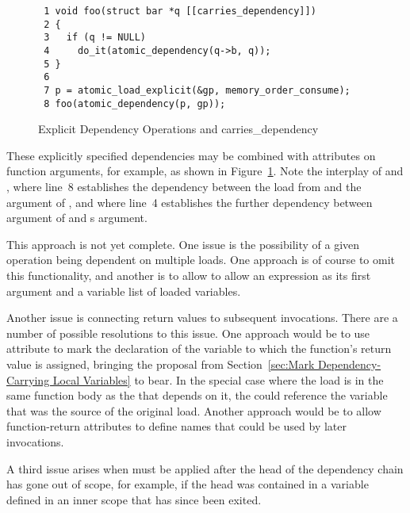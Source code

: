 \documentclass[letterpaper,twocolumn,10pt]{article}
\begin{document}
\begin{figure}[tbp]
{ \scriptsize
\begin{verbatim}
 1 void foo(struct bar *q [[carries_dependency]])
 2 {
 3   if (q != NULL)
 4     do_it(atomic_dependency(q->b, q));
 5 }
 6 
 7 p = atomic_load_explicit(&gp, memory_order_consume);
 8 foo(atomic_dependency(p, gp));
\end{verbatim}
}
\caption{Explicit Dependency Operations and carries\_dependency}
\label{fig:Explicit Dependency Operations and carries-dependency}
\end{figure}

These explicitly specified dependencies may be combined with
 attributes on function arguments,
for example, as shown in
Figure~\ref{fig:Explicit Dependency Operations and carries-dependency}.
Note the interplay of  and ,
where line~8 establishes the dependency between the load from 
and the  argument  of ,
and where line~4 establishes the further dependency between argument
 of  and s argument.

This approach is not yet complete.
One issue is the possibility of a given operation being dependent on
multiple  loads.
One approach is of course to omit this functionality, and another is
to allow  to allow an expression as its first
argument and a variable list of  loaded
variables.

Another issue is connecting  return values
to subsequent  invocations.
There are a number of possible resolutions to this issue.
One approach would be to use  attribute to
mark the declaration of the variable to which the function's return
value is assigned, bringing the proposal from
Section~\ref{sec:Mark Dependency-Carrying Local Variables}
to bear.
In the special case where the  load is in the
same function body as the  that depends on it,
the  could reference the variable that was the
source of the original  load.
Another approach would be to allow function-return \co{carries_dependency]]}
attributes to define names that could be used by later 
invocations.

A third issue arises when 
must be applied after the head of the dependency chain has gone
out of scope, for example, if the head was contained in a variable
defined in an inner scope that has since been exited.
\end{document}
